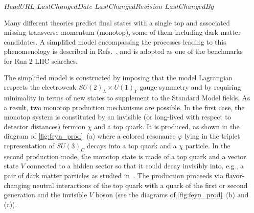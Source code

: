\svnidlong
{$HeadURL$}
{$LastChangedDate$}
{$LastChangedRevision$}
{$LastChangedBy$}

Many different theories predict final states with a single top and associated missing 
transverse momentum (monotop), some of them including dark matter candidates. 
A simplified model encompassing the processes leading to this phenomenology is described in Refs.~\cite{AndreaFuksMaltoni,Agram:2013wda,Boucheneb:2014wza},
and is adopted as one of the benchmarks for Run 2 LHC searches. 

The simplified model is constructed by imposing that the model Lagrangian
respects the electroweak $SU(2)_L \times U(1)_Y$ gauge symmetry and by
requiring minimality in terms of new states to supplement to the Standard
Model fields. As a result, two monotop production mechanisms are possible.
In the first case, the monotop system is constituted by an invisible (or
long-lived with respect to detector distances) fermion $\chi$ and a top quark.
It is produced, as shown in the diagram of \ref{fig:feyn_prod}~(a) where a colored
resonance $\varphi$ lying in the triplet representation of $SU(3)_C$ decays
into a top quark and a $\chi$ particle. In the second production mode, the
monotop state is made of a top quark and a vector state $V$ connected to a
hidden sector so that it could decay invisibly into, e.g., a pair of dark
matter particles as studied in~\cite{Boucheneb:2014wza}. The production proceeds via
flavor-changing neutral interactions of the top quark with a quark of the
first or second generation and the invisible $V$ boson (see the diagrams of
\ref{fig:feyn_prod}~(b) and (c)).



